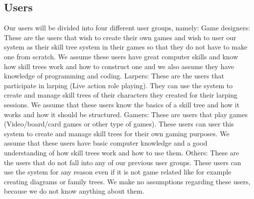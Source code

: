 \documentclass[12pt]{article}
\begin{document}
  \subsection{Users}
  Our users will be divided into four different user groups, namely:\newline\newline
  Game designers: These are the users that wish to create their own games and wish to user our system as their skill tree system in their games so that they do not have to make one from scratch. We assume these users have great computer skills and know how skill trees work and how to construct one and we also assume they have knowledge of programming and coding.\newline\newline
  Larpers: These are the users that participate in larping (Live action role playing). They can use the system to create and manage skill trees of their characters they created for their larping sessions. We assume that these users know the basics of a skill tree and how it works and how it should be structured.\newline\newline
  Gamers: These are users that play games (Video/board/card games or other type of games). These users can user this system to create and manage skill trees for their own gaming purposes. We assume that these users have basic computer knowledge and a good understanding of how skill trees work and how to use them.\newline\newline
  Others: These are the users that do not fall into any of our previous user groups. These users can use the system for any reason even if it is not game related like for example creating diagrams or family trees. We make no assumptions regarding these users, because we do not know anything about them.

  
\end{document}
